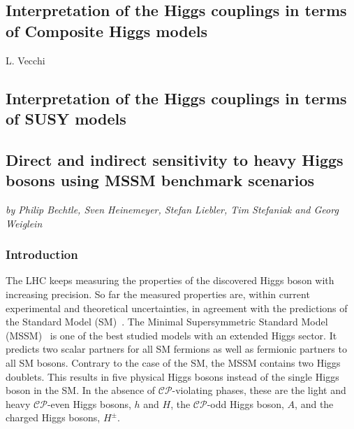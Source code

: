 \documentclass[../report.tex]{subfiles}
\providecommand{\main}{..}
\begin{document}
\subsection{Interpretation of the Higgs couplings in terms of Composite Higgs models}
\begin{center}
 {L. Vecchi}
\end{center}
\label{sec9:CHM}


\subsection{Interpretation of the Higgs couplings in terms of SUSY models}

\subsection{Direct and indirect sensitivity to heavy Higgs bosons using MSSM benchmark scenarios}
\begin{center}
\textit{by Philip Bechtle, Sven Heinemeyer, Stefan Liebler, Tim Stefaniak and Georg Weiglein}
\end{center}

\subsubsection*{Introduction}

The LHC keeps measuring the properties of the discovered Higgs boson with increasing precision. So far the measured properties are, within current experimental and theoretical uncertainties, in agreement with the predictions of the Standard Model (SM)~\cite{Khachatryan:2016vau}. The Minimal Supersymmetric Standard Model (MSSM)~\cite{Nilles:1983ge,Haber:1984rc,Gunion:1984yn} is one of the best studied models with an extended Higgs sector. It predicts two scalar partners for all SM fermions as well as fermionic partners to all SM bosons. Contrary to the case of the SM, the MSSM contains two Higgs doublets.
This results in five physical Higgs bosons instead of the single Higgs boson in the SM. In the absence of $\mathcal{CP}$-violating phases, these are the light and heavy $\mathcal{CP}$-even Higgs bosons,  
$h$ and $H$, the $\mathcal{CP}$-odd Higgs boson, $A$, and the charged Higgs bosons, $H^\pm$.
\end{document}
